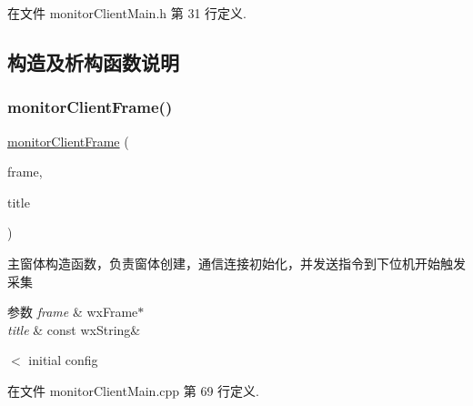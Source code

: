 在文件 monitor\+Client\+Main.\+h 第 31 行定义.



\subsection{构造及析构函数说明}
\mbox{\label{classmonitor_client_frame_ae98aa8b084a50fa578e1a648d125a85b}} 
\subsubsection{\texorpdfstring{monitor\+Client\+Frame()}{monitorClientFrame()}}
{\footnotesize\ttfamily \hyperlink{classmonitor_client_frame}{monitor\+Client\+Frame} (\begin{DoxyParamCaption}\item[{wx\+Frame $\ast$}]{frame,  }\item[{const wx\+String \&}]{title }\end{DoxyParamCaption})}



主窗体构造函数，负责窗体创建，通信连接初始化，并发送指令到下位机开始触发采集 


\begin{DoxyParams}{参数}
{\em frame} & wx\+Frame$\ast$ \\
\hline
{\em title} & const wx\+String\& \\
\hline
\end{DoxyParams}
$<$ initial config 

在文件 monitor\+Client\+Main.\+cpp 第 69 行定义.

